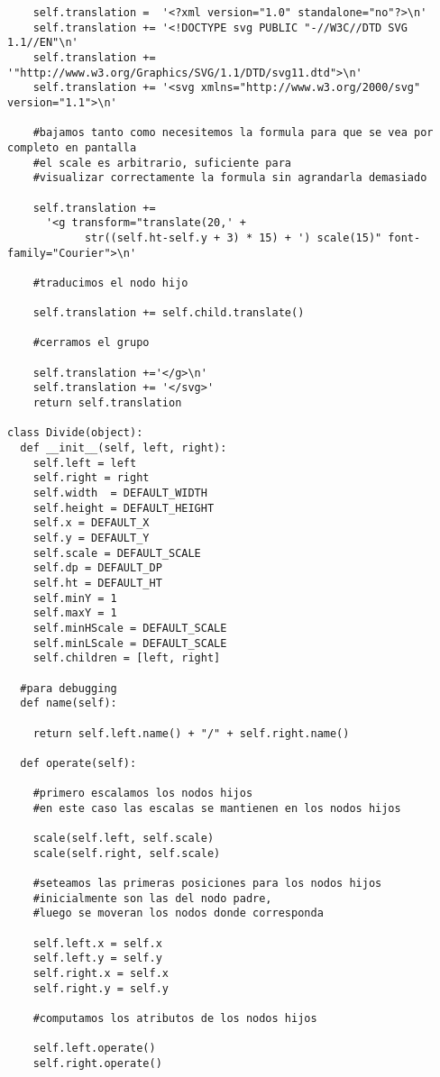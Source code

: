 \begin{verbatim}
    self.translation =  '<?xml version="1.0" standalone="no"?>\n'
    self.translation += '<!DOCTYPE svg PUBLIC "-//W3C//DTD SVG 1.1//EN"\n'
    self.translation += '"http://www.w3.org/Graphics/SVG/1.1/DTD/svg11.dtd">\n'
    self.translation += '<svg xmlns="http://www.w3.org/2000/svg" version="1.1">\n'

    #bajamos tanto como necesitemos la formula para que se vea por completo en pantalla
    #el scale es arbitrario, suficiente para 
    #visualizar correctamente la formula sin agrandarla demasiado

    self.translation +=
      '<g transform="translate(20,' + 
            str((self.ht-self.y + 3) * 15) + ') scale(15)" font-family="Courier">\n'
    
    #traducimos el nodo hijo

    self.translation += self.child.translate()

    #cerramos el grupo

    self.translation +='</g>\n'
    self.translation += '</svg>'
    return self.translation

class Divide(object):
  def __init__(self, left, right):
    self.left = left
    self.right = right
    self.width  = DEFAULT_WIDTH
    self.height = DEFAULT_HEIGHT
    self.x = DEFAULT_X
    self.y = DEFAULT_Y
    self.scale = DEFAULT_SCALE
    self.dp = DEFAULT_DP
    self.ht = DEFAULT_HT
    self.minY = 1
    self.maxY = 1
    self.minHScale = DEFAULT_SCALE
    self.minLScale = DEFAULT_SCALE
    self.children = [left, right]

  #para debugging
  def name(self):

    return self.left.name() + "/" + self.right.name()

  def operate(self):

    #primero escalamos los nodos hijos
    #en este caso las escalas se mantienen en los nodos hijos

    scale(self.left, self.scale)
    scale(self.right, self.scale)
    
    #seteamos las primeras posiciones para los nodos hijos
    #inicialmente son las del nodo padre,
    #luego se moveran los nodos donde corresponda

    self.left.x = self.x
    self.left.y = self.y 
    self.right.x = self.x
    self.right.y = self.y

    #computamos los atributos de los nodos hijos

    self.left.operate()
    self.right.operate()
    

\end{verbatim}
